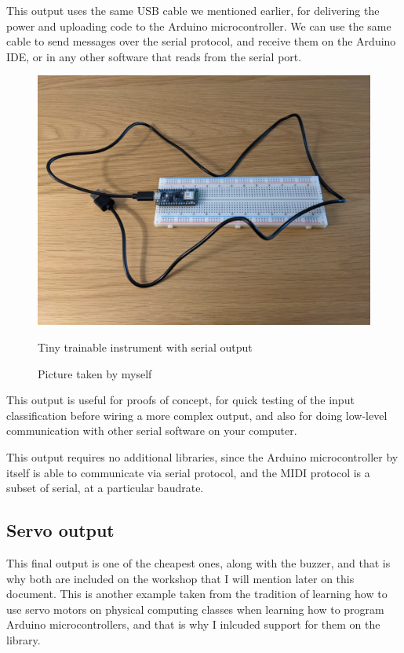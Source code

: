 This output uses the same USB cable we mentioned earlier, for delivering the power and uploading code to the Arduino microcontroller. We can use the same cable to send messages over the serial protocol, and receive them on the Arduino IDE, or in any other software that reads from the serial port.
\begin{figure}[ht]

  \centering
  \includegraphics[width=0.75\linewidth,height=0.25\textheight,keepaspectratio]{images/output-serial.jpg}
  \caption{Tiny trainable instrument with serial output}
  \caption*{Picture taken by myself}
  \label{fig:output-serial}
\end{figure}

This output is useful for proofs of concept, for quick testing of the input classification before wiring a more complex output, and also for doing low-level communication with other serial software on your computer. 

This output requires no additional libraries, since the Arduino microcontroller by itself is able to communicate via serial protocol, and the MIDI protocol is a subset of serial, at a particular baudrate.

\subsection{Servo output}

This final output is one of the cheapest ones, along with the buzzer, and that is why both are included on the workshop that I will mention later on this document. This is another example taken from the tradition of learning how to use servo motors on physical computing classes when learning how to program Arduino microcontrollers, and that is why I inlcuded support for them on the library.

